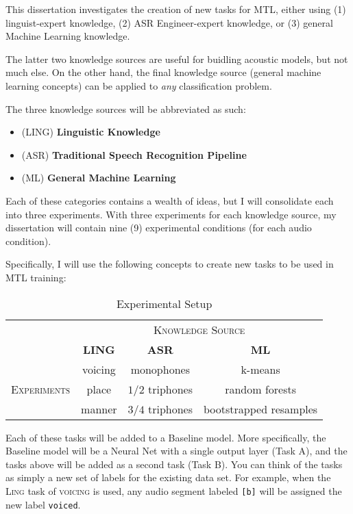 \documentclass[10pt,a4paper]{article}
\begin{document}
This dissertation investigates the creation of new tasks for MTL, either using (1) linguist-expert knowledge, (2) ASR Engineer-expert knowledge, or (3) general Machine Learning knowledge.

The latter two knowledge sources are useful for buidling acoustic models, but not much else. On the other hand, the final knowledge source (general machine learning concepts) can be applied to \textit{any} classification problem.

The three knowledge sources will be abbreviated as such:
  
\begin{itemize}
\item  (\textsc{LING}) \textbf{Linguistic Knowledge} 
\item (\textsc{ASR}) \textbf{Traditional Speech Recognition Pipeline}
\item (\textsc{ML}) \textbf{General Machine Learning}
\end{itemize}


Each of these categories contains a wealth of ideas, but I will consolidate each into three experiments. With three experiments for each knowledge source, my dissertation will contain nine (9) experimental conditions (for each audio condition).

Specifically, I will use the following concepts to create new tasks to be used in MTL training:

\begin{table}[htbp]
  \centering
  \begin{adjustbox}{width=.75\textwidth}
    \begin{tabular}{cccc}
      \toprule
      & \multicolumn{3}{c}{\textsc{Knowledge Source}}\\
      & \textbf{LING} & \textbf{ASR} & \textbf{ML}\\
      \midrule
      \multirow{3}{*}{\textsc{Experiments}} & voicing & monophones &  k-means \\
      & place & $1/2$ triphones & random forests  \\
      & manner & $3/4$ triphones &  bootstrapped resamples  \\
      \bottomrule
    \end{tabular}
    \label{table:data}
  \end{adjustbox}
  
  \caption{Experimental Setup}
  
\end{table}


Each of these tasks will be added to a Baseline model. More specifically, the Baseline model will be a Neural Net with a single output layer (Task A), and the tasks above will be added as a second task (Task B). You can think of the tasks as simply a new set of labels for the existing data set. For example, when the \textsc{Ling} task of \textsc{voicing} is used, any audio segment labeled \texttt{[b]} will be assigned the new label \texttt{voiced}.
\end{document}
